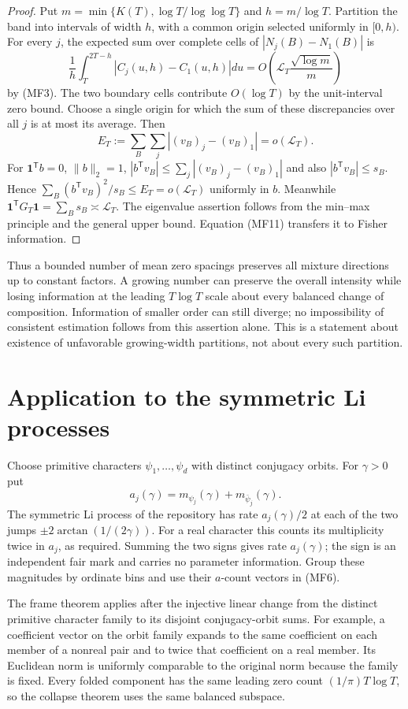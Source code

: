 \begin{proof}
Put $m=\min\{K(T),\log T/\log\log T\}$ and $h=m/\log T$.  Partition the
band into intervals of width $h$, with a common origin selected uniformly
in $[0,h)$.  For every $j$, the expected sum over complete cells of
$|N_j(B)-N_1(B)|$ is
\[
 \frac1h\int_T^{2T-h}|C_j(u,h)-C_1(u,h)|du
 =O\left(\mathcal L_T\frac{\sqrt{\log m}}m\right)
\]
by (MF3).  The two boundary cells contribute $O(\log T)$ by the
unit-interval zero bound.  Choose a single origin for which the sum of
these discrepancies over all $j$ is at most its average.  Then
\[
 E_T:=\sum_B\sum_j|(v_B)_j-(v_B)_1|=o(\mathcal L_T).
\]
For $\boldsymbol1^{\mathsf T}b=0$, $\|b\|_2=1$,
$|b^{\mathsf T}v_B|\le\sum_j|(v_B)_j-(v_B)_1|$ and also
$|b^{\mathsf T}v_B|\le s_B$.  Hence
$\sum_B(b^{\mathsf T}v_B)^2/s_B\le E_T=o(\mathcal L_T)$ uniformly
in $b$.  Meanwhile
$\boldsymbol1^{\mathsf T}G_T\boldsymbol1=\sum_Bs_B\asymp\mathcal L_T$.
The eigenvalue assertion follows from the min--max principle and the
general upper bound.  Equation (MF11) transfers it to Fisher information.
\end{proof}

Thus a bounded number of mean zero spacings preserves all mixture
directions up to constant factors.  A growing number can preserve the
overall intensity while losing information at the leading $T\log T$ scale
about every balanced change of composition. Information of smaller order
can still diverge; no impossibility of consistent estimation follows from
this assertion alone. This is a statement about existence of
unfavorable growing-width partitions, not about every such partition.

\section{Application to the symmetric Li processes}

Choose primitive characters $\psi_1,\ldots,\psi_d$ with distinct
conjugacy orbits.  For $\gamma>0$ put
\[
 a_j(\gamma)=m_{\psi_j}(\gamma)+m_{\bar\psi_j}(\gamma).
\]
The symmetric Li process of the repository has rate $a_j(\gamma)/2$ at
each of the two jumps
$\pm2\arctan(1/(2\gamma))$.  For a real character this counts its
multiplicity twice in $a_j$, as required.  Summing the two signs gives
rate $a_j(\gamma)$; the sign is an independent fair mark and carries no
parameter information.  Group these magnitudes by ordinate bins and
use their $a$-count vectors in (MF6).

The frame theorem applies after the injective linear change from the
distinct primitive character family to its disjoint conjugacy-orbit sums.
For example, a coefficient vector on the orbit family expands to the
same coefficient on each member of a nonreal pair and to twice that
coefficient on a real member.  Its Euclidean norm is uniformly comparable
to the original norm because the family is fixed.  Every folded component
has the same leading zero count $(1/\pi)T\log T$, so the collapse theorem
uses the same balanced subspace.


